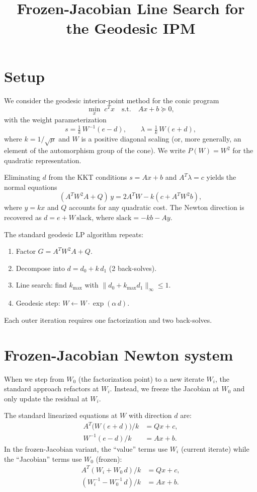 \documentclass{article}
\title{Frozen-Jacobian Line Search for the Geodesic IPM}
\author{}
\date{}
\begin{document}
\maketitle

\section{Setup}

We consider the geodesic interior-point method for the conic program
\[
  \min_x\; c^T x \quad \text{s.t.}\quad Ax + b \succeq 0,
\]
with the weight parameterization
\[
  s = \tfrac{1}{k}\,W^{-1}(e - d), \qquad
  \lambda = \tfrac{1}{k}\,W(e + d),
\]
where $k = 1/\sqrt{\mu}$ and $W$ is a positive diagonal scaling (or,
more generally, an element of the automorphism group of the cone).
We write $P(W) = W^2$ for the quadratic representation.

Eliminating $d$ from the KKT conditions $s = Ax + b$ and
$A^T\lambda = c$ yields the normal equations
\begin{equation}\label{eq:standard}
  (A^T W^2 A + Q)\,y = 2A^T W - k(c + A^T W^2 b),
\end{equation}
where $y = kx$ and $Q$ accounts for any quadratic cost.  The Newton
direction is recovered as $d = e + W\,\text{slack}$, where
$\text{slack} = -kb - Ay$.

The standard geodesic LP algorithm repeats:
\begin{enumerate}
\item Factor $G = A^T W^2 A + Q$.
\item Decompose into $d = d_0 + k\,d_1$ (2 back-solves).
\item Line search: find $k_{\max}$ with $\|d_0 + k_{\max} d_1\|_\infty \le 1$.
\item Geodesic step: $W \leftarrow W \cdot \exp(\alpha\, d)$.
\end{enumerate}
Each outer iteration requires one factorization and two back-solves.

\section{Frozen-Jacobian Newton system}

When we step from $W_0$ (the factorization point) to a new iterate $W_i$,
the standard approach refactors at $W_i$.  Instead, we freeze the Jacobian
at $W_0$ and only update the residual at $W_i$.

The standard linearized equations at $W$ with direction $d$ are:
\begin{align}
  A^T\bigl(W(e+d)\bigr)/k &= Qx + c, \label{eq:dual-std}\\
  W^{-1}(e-d)/k &= Ax + b. \label{eq:primal-std}
\end{align}
In the frozen-Jacobian variant, the ``value'' terms use $W_i$ (current
iterate) while the ``Jacobian'' terms use $W_0$ (frozen):
\begin{align}
  A^T(W_i + W_0\, d)/k &= Qx + c, \label{eq:dual-frozen}\\
  (W_i^{-1} - W_0^{-1}\, d)/k &= Ax + b. \label{eq:primal-frozen}
\end{align}
\end{document}
